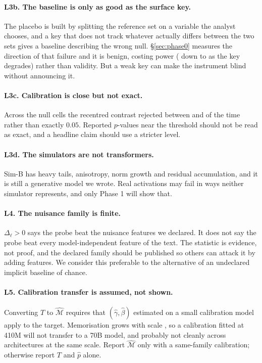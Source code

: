 \documentclass[10pt,twocolumn,letterpaper]{article}
\begin{document}
\paragraph{L3b. The baseline is only as good as the surface key.} The placebo is built by splitting the reference set on a variable the analyst chooses, and a key that does not track whatever actually differs between the two sets gives a baseline describing the wrong null. \S\ref{sec:phase0} measures the direction of that failure and it is benign, costing power (\KeyPwFive{} down to \KeyPwFifty{} as the key degrades) rather than validity. But a weak key can make the instrument blind without announcing it.

\paragraph{L3c. Calibration is close but not exact.} Across the null cells the recentred contrast rejected between \SlopeAAdjZero{} and \SlopeBAdjZero{} of the time rather than exactly $0.05$. Reported $p$-values near the threshold should not be read as exact, and a headline claim should use a stricter level.

\paragraph{L3d. The simulators are not transformers.} Sim-B has heavy tails, anisotropy, norm growth and residual accumulation, and it is still a generative model we wrote. Real activations may fail in ways neither simulator represents, and only Phase 1 will show that.

\paragraph{L4. The nuisance family is finite.} $\Delta_\ell>0$ says the probe beat the nuisance features we declared. It does not say the probe beat every model-independent feature of the text. The statistic is evidence, not proof, and the declared family should be published so others can attack it by adding features. We consider this preferable to the alternative of an undeclared implicit baseline of chance.

\paragraph{L5. Calibration transfer is assumed, not shown.} Converting $T$ to $\widehat{\mathcal{M}}$ requires that $(\hat\gamma,\hat\beta)$ estimated on a small calibration model apply to the target. Memorisation grows with scale \cite{carlini2023quantifying,tirumala2022memorization}, so a calibration fitted at 410M will not transfer to a 70B model, and probably not cleanly across architectures at the same scale. Report $\widehat{\mathcal{M}}$ only with a same-family calibration; otherwise report $T$ and $\hat p$ alone.
\end{document}
